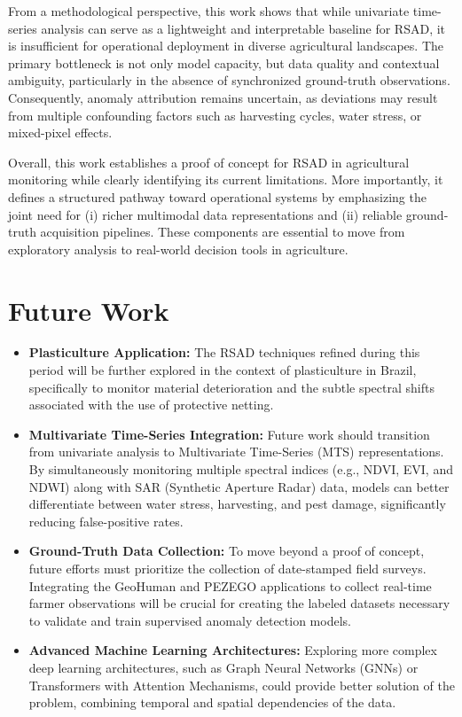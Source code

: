 \documentclass{article} %
\begin{document}
From a methodological perspective, this work shows that while univariate time-series analysis can serve as a lightweight and interpretable baseline for RSAD, it is insufficient for operational deployment in diverse agricultural landscapes. The primary bottleneck is not only model capacity, but data quality and contextual ambiguity, particularly in the absence of synchronized ground-truth observations. Consequently, anomaly attribution remains uncertain, as deviations may result from multiple confounding factors such as harvesting cycles, water stress, or mixed-pixel effects.

Overall, this work establishes a proof of concept for RSAD in agricultural monitoring while clearly identifying its current limitations. More importantly, it defines a structured pathway toward operational systems by emphasizing the joint need for (i) richer multimodal data representations and (ii) reliable ground-truth acquisition pipelines. These components are essential to move from exploratory analysis to real-world decision tools in agriculture.

\section{Future Work}

\begin{itemize}
    \item \textbf{Plasticulture Application:} The RSAD techniques refined during this period will be further explored in the context of plasticulture in Brazil, specifically to monitor material deterioration and the subtle spectral shifts associated with the use of protective netting.
    \item \textbf{Multivariate Time-Series Integration:} Future work should transition from univariate analysis to Multivariate Time-Series (MTS) representations. By simultaneously monitoring multiple spectral indices (e.g., NDVI, EVI, and NDWI) along with SAR (Synthetic Aperture Radar) data, models can better differentiate between water stress, harvesting, and pest damage, significantly reducing false-positive rates.
    \item \textbf{Ground-Truth Data Collection:} To move beyond a proof of concept, future efforts must prioritize the collection of date-stamped field surveys. Integrating the GeoHuman and PEZEGO applications to collect real-time farmer observations will be crucial for creating the labeled datasets necessary to validate and train supervised anomaly detection models.
    \item \textbf{Advanced Machine Learning Architectures:} Exploring more complex deep learning architectures, such as Graph Neural Networks (GNNs) or Transformers with Attention Mechanisms, could provide better solution of the problem, combining temporal and spatial dependencies of the data.
\end{itemize}
\end{document}
